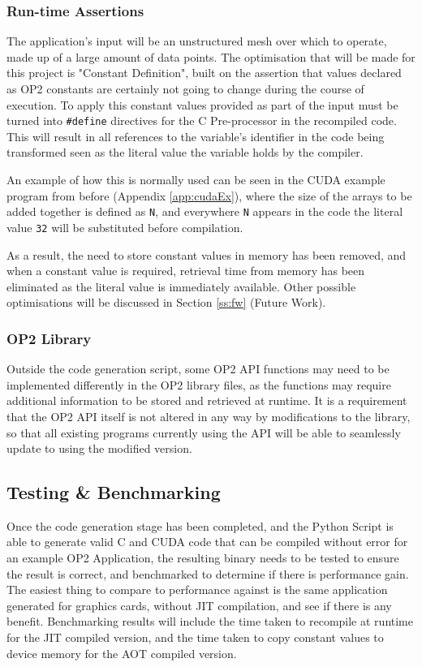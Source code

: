 \subsubsection{Run-time Assertions}
The application's input will be an unstructured mesh over which to operate, made up of a large amount of data points. The optimisation that will be made for this project is "Constant Definition", built on the assertion that values declared as OP2 constants are certainly not going to change during the course of execution. To apply this constant values provided as part of the input must be turned into \verb|#define| directives for the C Pre-processor in the recompiled code. This will result in all references to the variable's identifier in the code being transformed seen as the literal value the variable holds by the compiler.
\par
An example of how this is normally used can be seen in the CUDA example program from before (Appendix \ref{app:cudaEx}), where the size of the arrays to be added together is defined as \verb|N|, and everywhere \verb|N| appears in the code the literal value \verb|32| will be substituted before compilation.
\par
As a result, the need to store constant values in memory has been removed, and when a constant value is required, retrieval time from memory has been eliminated as the literal value is immediately available. Other possible optimisations will be discussed in Section \ref{ss:fw} (Future Work).

\subsubsection{OP2 Library}
Outside the code generation script, some OP2 API functions may need to be implemented differently in the OP2 library files, as the functions may require additional information to be stored and retrieved at runtime. It is a requirement that the OP2 API itself is not altered in any way by modifications to the library, so that all existing programs currently using the API will be able to seamlessly update to using the modified version.

\subsection{Testing \& Benchmarking}
Once the code generation stage has been completed, and the Python Script is able to generate valid C and CUDA code that can be compiled without error for an example OP2 Application, the resulting binary needs to be tested to ensure the result is correct, and benchmarked to determine if there is performance gain. The easiest thing to compare to performance against is the same application generated for graphics cards, without JIT compilation, and see if there is any benefit. Benchmarking results will include the time taken to recompile at runtime for the JIT compiled version, and the time taken to copy constant values to device memory for the AOT compiled version.

